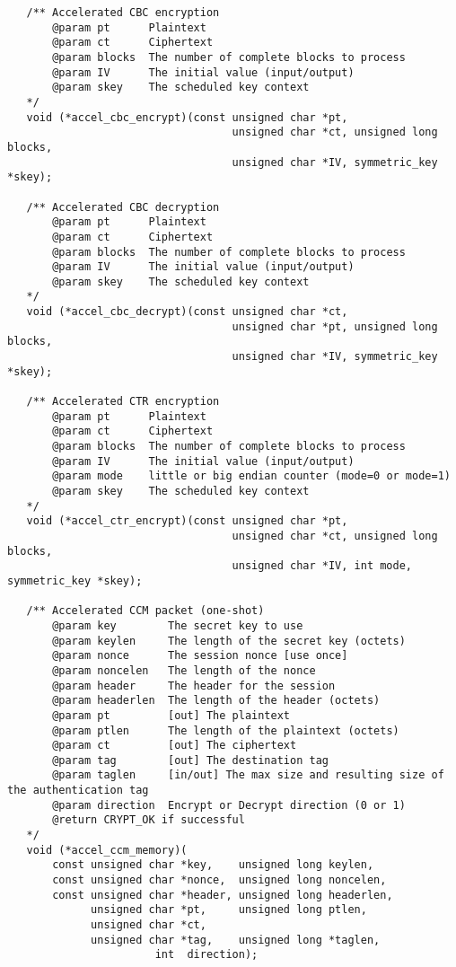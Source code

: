 \documentclass[a4paper]{book}
\begin{document}
\begin{small}
\begin{verbatim}
   /** Accelerated CBC encryption 
       @param pt      Plaintext
       @param ct      Ciphertext
       @param blocks  The number of complete blocks to process
       @param IV      The initial value (input/output)
       @param skey    The scheduled key context
   */
   void (*accel_cbc_encrypt)(const unsigned char *pt, 
                                   unsigned char *ct, unsigned long blocks, 
                                   unsigned char *IV, symmetric_key *skey);

   /** Accelerated CBC decryption 
       @param pt      Plaintext
       @param ct      Ciphertext
       @param blocks  The number of complete blocks to process
       @param IV      The initial value (input/output)
       @param skey    The scheduled key context
   */
   void (*accel_cbc_decrypt)(const unsigned char *ct, 
                                   unsigned char *pt, unsigned long blocks, 
                                   unsigned char *IV, symmetric_key *skey);

   /** Accelerated CTR encryption 
       @param pt      Plaintext
       @param ct      Ciphertext
       @param blocks  The number of complete blocks to process
       @param IV      The initial value (input/output)
       @param mode    little or big endian counter (mode=0 or mode=1)
       @param skey    The scheduled key context
   */
   void (*accel_ctr_encrypt)(const unsigned char *pt, 
                                   unsigned char *ct, unsigned long blocks, 
                                   unsigned char *IV, int mode, symmetric_key *skey);

   /** Accelerated CCM packet (one-shot)
       @param key        The secret key to use
       @param keylen     The length of the secret key (octets)
       @param nonce      The session nonce [use once]
       @param noncelen   The length of the nonce
       @param header     The header for the session
       @param headerlen  The length of the header (octets)
       @param pt         [out] The plaintext
       @param ptlen      The length of the plaintext (octets)
       @param ct         [out] The ciphertext
       @param tag        [out] The destination tag
       @param taglen     [in/out] The max size and resulting size of the authentication tag
       @param direction  Encrypt or Decrypt direction (0 or 1)
       @return CRYPT_OK if successful
   */
   void (*accel_ccm_memory)(
       const unsigned char *key,    unsigned long keylen,
       const unsigned char *nonce,  unsigned long noncelen,
       const unsigned char *header, unsigned long headerlen,
             unsigned char *pt,     unsigned long ptlen,
             unsigned char *ct,
             unsigned char *tag,    unsigned long *taglen,
                       int  direction);


\end{verbatim}
\end{small}
\end{document}
